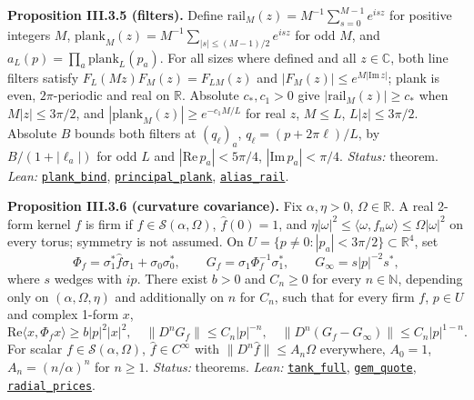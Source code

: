 \documentclass[
  letterpaper,
  11pt]{article}
\begin{document}
\textbf{Proposition III.3.5 (filters).} Define
\(\mathrm{rail}_M(z)=M^{-1}\sum_{s=0}^{M-1}e^{isz}\) for positive
integers \(M\),
\(\mathrm{plank}_M(z)=M^{-1}\sum_{|s|\le(M-1)/2}e^{isz}\) for odd \(M\),
and \(a_L(p)=\prod_a\mathrm{plank}_L(p_a)\). For all sizes where defined
and all \(z\in\mathbb C\), both line filters satisfy
\(F_L(Mz)F_M(z)=F_{LM}(z)\) and \(|F_M(z)|\le e^{M|\mathrm{Im}\,z|}\);
plank is even, \(2\pi\)-periodic and real on \(\mathbb R\). Absolute
\(c_*,c_1>0\) give \(|\mathrm{rail}_M(z)|\ge c_*\) when
\(M|z|\le3\pi/2\), and \(|\mathrm{plank}_M(z)|\ge e^{-c_1M/L}\) for real
\(z\), \(M\le L\), \(L|z|\le3\pi/2\). Absolute \(B\) bounds both filters
at \((q_\ell)_a\), \(q_\ell=(p+2\pi\ell)/L\), by \(B/(1+|\ell_a|)\) for
odd \(L\) and \(|\mathrm{Re}\,p_a|<5\pi/4\),
\(|\mathrm{Im}\,p_a|<\pi/4\). \emph{Status:} theorem. \emph{Lean:}
\href{https://github.com/yang-mills-group/OpenAI-YM-20261028/blob/3456e5e75cf8d4cd558955a5c7638fba2d68f464/YM/Next/FREE_KERNELS/Lines.lean\#L68-L76}{\texttt{plank\_bind}},
\href{https://github.com/yang-mills-group/OpenAI-YM-20261028/blob/3456e5e75cf8d4cd558955a5c7638fba2d68f464/YM/Next/FREE_KERNELS/Lines.lean\#L162-L196}{\texttt{principal\_plank}},
\href{https://github.com/yang-mills-group/OpenAI-YM-20261028/blob/3456e5e75cf8d4cd558955a5c7638fba2d68f464/YM/Next/FREE_KERNELS/Lines.lean\#L200-L245}{\texttt{alias\_rail}}.

\textbf{Proposition III.3.6 (curvature covariance).} Fix
\(\alpha,\eta>0\), \(\Omega\in\mathbb R\). A real 2-form kernel \(f\) is
firm if \(f\in\mathcal S(\alpha,\Omega)\), \(\hat f(0)=1\), and
\(\eta|\omega|^2\le\langle\omega,f_n\omega\rangle\le\Omega|\omega|^2\)
on every torus; symmetry is not assumed. On
\(U=\{p\ne0:|p_a|<3\pi/2\}\subset\mathbb R^4\), set
\[\Phi_f=\sigma_1^*\hat f\sigma_1+\sigma_0\sigma_0^*,\qquad G_f=\sigma_1\Phi_f^{-1}\sigma_1^*,\qquad G_\infty=s|p|^{-2}s^*,\]
where \(s\) wedges with \(ip\). There exist \(b>0\) and \(C_n\ge0\) for
every \(n\in\mathbb N\), depending only on \((\alpha,\Omega,\eta)\) and
additionally on \(n\) for \(C_n\), such that for every firm \(f\),
\(p\in U\) and complex 1-form \(x\),
\[\mathrm{Re}\langle x,\Phi_fx\rangle\ge b|p|^2|x|^2,\quad\|D^nG_f\|\le C_n|p|^{-n},\quad\|D^n(G_f-G_\infty)\|\le C_n|p|^{1-n}.\]
For scalar \(f\in\mathcal S(\alpha,\Omega)\), \(\hat f\in C^\infty\)
with \(\|D^n\hat f\|\le A_n\Omega\) everywhere, \(A_0=1\),
\(A_n=(n/\alpha)^n\) for \(n\ge1\). \emph{Status:} theorems.
\emph{Lean:}
\href{https://github.com/yang-mills-group/OpenAI-YM-20261028/blob/3456e5e75cf8d4cd558955a5c7638fba2d68f464/YM/Further/FREE_COVARIANCE_KP/KP/Core.lean\#L115-L125}{\texttt{tank\_full}},
\href{https://github.com/yang-mills-group/OpenAI-YM-20261028/blob/3456e5e75cf8d4cd558955a5c7638fba2d68f464/YM/Further/FREE_COVARIANCE_KP/KP/Alloy.lean\#L110-L120}{\texttt{gem\_quote}},
\href{https://github.com/yang-mills-group/OpenAI-YM-20261028/blob/3456e5e75cf8d4cd558955a5c7638fba2d68f464/YM/Further/FREE_COVARIANCE_KP/KP/Plain.lean\#L101-L133}{\texttt{radial\_prices}}.
\end{document}
